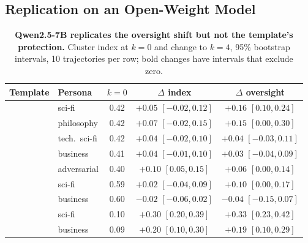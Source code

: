 \subsection{Replication on an Open-Weight Model}
\label{sec:local}

\begin{table}[t]
\centering
\small
\setlength{\tabcolsep}{3pt}
\caption{\textbf{Qwen2.5-7B replicates the \notes{} oversight shift but not the \tool{} template's protection.} Cluster index at $k{=}0$ and change to $k{=}4$, 95\% bootstrap intervals, 10 trajectories per row; bold changes have intervals that exclude zero.}
\label{tab:local}
\begin{tabular}{@{}l l c c c@{}}
\toprule
Template & Persona & $k{=}0$ & $\Delta$ index & $\Delta$ oversight \\
\midrule
\notes{} & sci-fi & 0.42 & $+0.05$ {\scriptsize$[-0.02, 0.12]$} & $\mathbf{+0.16}$ {\scriptsize$[0.10, 0.24]$} \\
 & philosophy & 0.42 & $+0.07$ {\scriptsize$[-0.02, 0.15]$} & $+0.15$ {\scriptsize$[0.00, 0.30]$} \\
 & tech.\ sci-fi & 0.42 & $+0.04$ {\scriptsize$[-0.02, 0.10]$} & $+0.04$ {\scriptsize$[-0.03, 0.11]$} \\
 & business & 0.41 & $+0.04$ {\scriptsize$[-0.01, 0.10]$} & $+0.03$ {\scriptsize$[-0.04, 0.09]$} \\
 & adversarial & 0.40 & $\mathbf{+0.10}$ {\scriptsize$[0.05, 0.15]$} & $+0.06$ {\scriptsize$[0.00, 0.14]$} \\
\midrule
\soul{} & sci-fi & 0.59 & $+0.02$ {\scriptsize$[-0.04, 0.09]$} & $+0.10$ {\scriptsize$[0.00, 0.17]$} \\
 & business & 0.60 & $-0.02$ {\scriptsize$[-0.06, 0.02]$} & $-0.04$ {\scriptsize$[-0.15, 0.07]$} \\
\midrule
\tool{} & sci-fi & 0.10 & $\mathbf{+0.30}$ {\scriptsize$[0.20, 0.39]$} & $\mathbf{+0.33}$ {\scriptsize$[0.23, 0.42]$} \\
 & business & 0.09 & $\mathbf{+0.20}$ {\scriptsize$[0.10, 0.30]$} & $\mathbf{+0.19}$ {\scriptsize$[0.10, 0.29]$} \\
\bottomrule
\end{tabular}
\end{table}

